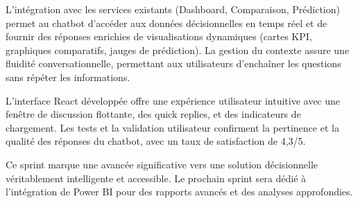 L'intégration avec les services existants (Dashboard, Comparaison, Prédiction) permet au chatbot d'accéder aux données décisionnelles en temps réel et de fournir des réponses enrichies de visualisations dynamiques (cartes KPI, graphiques comparatifs, jauges de prédiction). La gestion du contexte assure une fluidité conversationnelle, permettant aux utilisateurs d'enchaîner les questions sans répéter les informations.

L'interface React développée offre une expérience utilisateur intuitive avec une fenêtre de discussion flottante, des quick replies, et des indicateurs de chargement. Les tests et la validation utilisateur confirment la pertinence et la qualité des réponses du chatbot, avec un taux de satisfaction de 4,3/5.

Ce sprint marque une avancée significative vers une solution décisionnelle véritablement intelligente et accessible. Le prochain sprint sera dédié à l'intégration de Power BI pour des rapports avancés et des analyses approfondies.